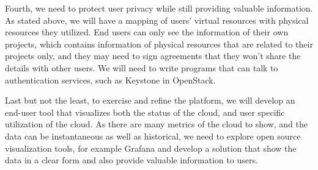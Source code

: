 Fourth, we need to protect user privacy while still providing valuable information. As stated above, we will have a mapping of users’ virtual resources with physical resources they utilized. End users can only see the information of their own projects, which contains information of physical resources that are related to their projects only, and they may need to sign agreements that they won’t share the details with other users. We will need to write programs that can talk to authentication services, such as Keystone in OpenStack. 

Last but not the least, to exercise and refine the platform, we will develop an end-user tool that visualizes both the status of the cloud, and user specific utilization of the cloud. As there are many metrics of the cloud to show, and the data can be instantaneous as well as historical, we need to explore open source visualization tools, for example Grafana and develop a solution that show the data in a clear form and also provide valuable information to users. 



